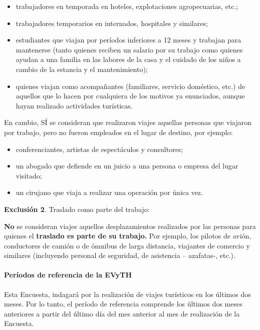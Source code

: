 \documentclass[
  openany]{book}
\begin{document}
\begin{itemize}
\item
  trabajadores en temporada en hoteles, explotaciones agropecuarias, etc.;
\item
  trabajadores temporarios en internados, hospitales y similares;
\item
  estudiantes que viajan por períodos inferiores a 12 meses y trabajan para mantenerse (tanto quienes reciben un salario por su trabajo como quienes ayudan a una familia en las labores de la casa y el cuidado de los niños a cambio de la estancia y el mantenimiento);
\item
  quienes viajan como acompañantes (familiares, servicio doméstico, etc.) de aquellos que lo hacen por cualquiera de los motivos ya enunciados, aunque hayan realizado actividades turísticas.
\end{itemize}

En cambio, SÍ se consideran que realizaron viajes aquellas personas que viajaron por trabajo, pero no fueron empleados en el lugar de destino, por ejemplo:

\begin{itemize}
\item
  conferenciantes, artistas de espectáculos y consultores;
\item
  un abogado que defiende en un juicio a una persona o empresa del lugar visitado;
\item
  un cirujano que viaja a realizar una operación por única vez.
\end{itemize}

\textbf{Exclusión 2}. Traslado como parte del trabajo:

\textbf{No} se consideran viajes aquellos desplazamientos realizados por las personas para quienes el \textbf{traslado es parte de su trabajo.} Por ejemplo, los pilotos de avión, conductores de camión o de ómnibus de larga distancia, viajantes de comercio y similares (incluyendo personal de seguridad, de asistencia -- azafatas-, etc.).

\hypertarget{peruxedodos-de-referencia-de-la-evyth}{%
\paragraph{Períodos de referencia de la EVyTH}\label{peruxedodos-de-referencia-de-la-evyth}}

Esta Encuesta, indagará por la realización de viajes turísticos en los últimos dos meses. Por lo tanto, el período de referencia comprende los últimos dos meses anteriores a partir del último día del mes anterior al mes de realización de la Encuesta.
\end{document}
